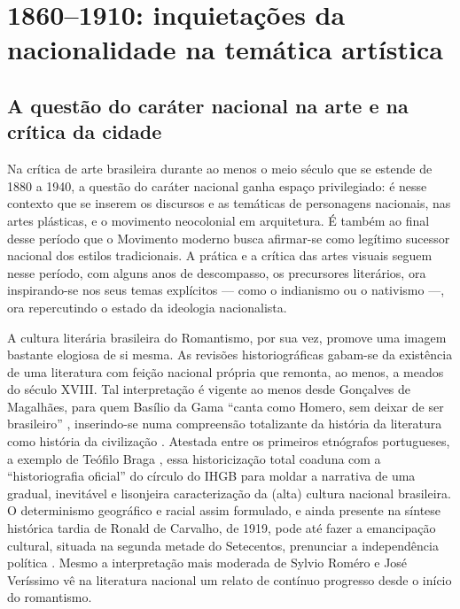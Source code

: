 \hypertarget{inquietauxe7uxf5es-da-nacionalidade-na-temuxe1tica-artuxedstica}{%
\section{1860--1910: inquietações da nacionalidade na temática
artística}\label{inquietauxe7uxf5es-da-nacionalidade-na-temuxe1tica-artuxedstica}}

\hypertarget{a-questuxe3o-do-caruxe1ter-nacional-na-arte-e-na-cruxedtica-da-cidade}{%
\subsection{A questão do caráter nacional na arte e na crítica da
cidade}\label{a-questuxe3o-do-caruxe1ter-nacional-na-arte-e-na-cruxedtica-da-cidade}}

Na crítica de arte brasileira durante ao menos o meio século que se
estende de 1880 a 1940, a questão do caráter nacional ganha espaço
privilegiado: é nesse contexto que se inserem os discursos e as
temáticas de personagens nacionais, nas artes plásticas, e o movimento
neocolonial em arquitetura. É também ao final desse período que o
Movimento moderno busca afirmar-se como legítimo sucessor nacional dos
estilos tradicionais. A prática e a crítica das artes visuais seguem
nesse período, com alguns anos de descompasso, os precursores
literários, ora inspirando-se nos seus temas explícitos --- como o
indianismo ou o nativismo ---, ora repercutindo o estado da ideologia
nacionalista.

A cultura literária brasileira do Romantismo, por sua vez, promove uma
imagem bastante elogiosa de si mesma. As revisões historiográficas
gabam-se da existência de uma literatura com feição nacional própria que
remonta, ao menos, a meados do século XVIII. Tal interpretação é vigente
ao menos desde Gonçalves de Magalhães, para quem Basílio da Gama ``canta
como Homero, sem deixar de ser brasileiro''
\autocite*[p.~47]{magalhaes:1834resume}, inserindo-se numa compreensão
totalizante da história da literatura como história da civilização
\autocite[p.~140]{botelho:2011pequena23}. Atestada entre os primeiros
etnógrafos portugueses, a exemplo de Teófilo Braga
\autocite*{braga:1870historia}, essa historicização total coaduna com a
``historiografia oficial'' do círculo do IHGB para moldar a narrativa de
uma gradual, inevitável e lisonjeira caracterização da (alta) cultura
nacional brasileira. O determinismo geográfico e racial assim formulado,
e ainda presente na síntese histórica tardia de Ronald de Carvalho, de
1919, pode até fazer a emancipação cultural, situada na segunda metade
do Setecentos, prenunciar a independência política
\autocite[p.~47]{carvalho:1937pequena}. Mesmo a interpretação mais
moderada de Sylvio Roméro e José Veríssimo
\autocite[p.~143]{botelho:2011pequena23} vê na literatura nacional um
relato de contínuo progresso desde o início do romantismo.

